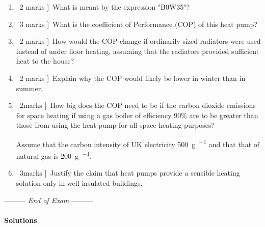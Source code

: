 \documentclass[a4paper,12pt,fleqn]{article}
\newcommand{\lastwords}{End of Exam}
\begin{document}
\begin{enumerate} [label=\alph*)]
\item \lbrack\ 2 marks ]\ What is meant by the expression "B0W35"?
\item \lbrack\ 3 marks ]\ What is the coefficient of Performance (COP) of this heat pump?
\item \lbrack\ 2 marks ]\ How would the COP change if ordinarily sized radiators were used instead of under floor heating, assuming that the radiators provided sufficient heat to the house?
\item \lbrack\ 2 marks ]\ Explain why the COP would likely be lower in winter than in summer.
\item \lbrack\ 2marks ]\ How big does the COP need to be if the carbon dioxide emissions for space heating if using a gas boiler of efficiency 90\% are to be greater than those from using the heat pump for all space heating purposes? \par
Assume that the carbon intensity of UK electricity \SI{500}{\gram\per\kilowatthour} and that that of natural gas is \SI{200}{\gram\per\kilowatthour}.
\item \lbrack\ 3marks ]\ Justify the claim that heat pumps provide a sensible heating solution only in well insulated buildings.
\end{enumerate}
\begin{center}
\vspace{3cm}
--------- \textit{\lastwords} ---------
\end{center}


\label{finalpage}


\newpage
\paragraph{\textbf{Solutions} \ }
\end{document}
